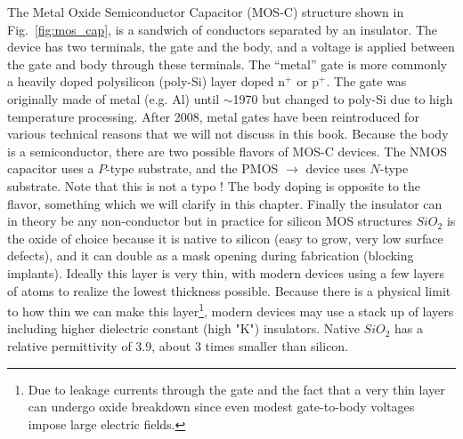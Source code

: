 The Metal Oxide Semiconductor Capacitor (MOS-C) structure shown in Fig.~\ref{fig:mos_cap},  is a sandwich of conductors separated by an insulator.  The device has two terminals, the gate and the body, and a voltage is applied between the gate and body through these terminals.  The  “metal” gate is more commonly a heavily doped polysilicon (poly-Si) layer doped n$^+$ or p$^+$.  The gate was originally made of metal (e.g. Al) until $\sim$1970 but changed to poly-Si due to high temperature processing. After 2008, metal gates have been reintroduced for various technical reasons that we will not discuss in this book.  Because the body is a semiconductor, there are two possible flavors of MOS-C devices.  The NMOS capacitor uses a  $P$-type substrate, and the PMOS  $\rightarrow$ device uses $N$-type substrate.  Note that this is not a typo !  The body doping is opposite to the flavor, something which we will clarify in this chapter.  Finally the insulator can in theory be any non-conductor but in practice for silicon MOS structures $SiO_2$ is the oxide of choice because it is native to silicon (easy to grow, very low surface defects), and it can double as a mask opening during fabrication (blocking implants).  Ideally this layer is very thin, with modern devices using a few layers of atoms to realize the lowest thickness possible.  Because there is a physical limit to how thin we can make this layer\footnote{Due to leakage currents through the gate and the fact that a very thin layer can undergo oxide breakdown since even modest gate-to-body voltages impose large electric fields.}, modern devices may use a stack up of layers including higher dielectric constant (high "K") insulators.  Native $SiO_2$ has a relative permittivity of 3.9, about 3 times smaller than silicon.

